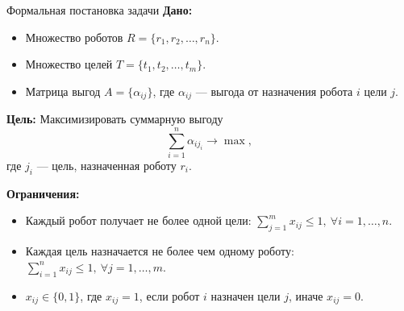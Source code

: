 \documentclass{beamer}
\begin{document}
	\begin{frame}{Формальная постановка задачи}
		\vspace*{-0.2cm}
		\small
		\textbf{Дано:}
		\begin{itemize}
			\item Множество роботов $R = \{r_1, r_2, \ldots, r_n\}$.
			\item Множество целей $T = \{t_1, t_2, \ldots, t_m\}$.
			\item Матрица выгод $A = \{\alpha_{ij}\}$, где $\alpha_{ij}$ --- выгода от назначения робота $i$ цели $j$.
		\end{itemize}
		
		\textbf{Цель:} Максимизировать суммарную выгоду
		\[
		\sum_{i=1}^n \alpha_{i j_i} \rightarrow \max,
		\]
		где $j_i$ --- цель, назначенная роботу $r_i$.
		

		\vspace*{0.1cm}
		\textbf{Ограничения:}
		\begin{itemize}
			\item Каждый робот получает не более одной цели: $\sum_{j=1}^m x_{ij} \leq 1, \ \forall i = 1, \ldots, n$.
			\item Каждая цель назначается не более чем одному роботу: $\sum_{i=1}^n x_{ij} \leq 1, \ \forall j = 1, \ldots, m$.
			\item $x_{ij} \in \{0, 1\}$, где $x_{ij} = 1$, если робот $i$ назначен цели $j$, иначе $x_{ij} = 0$.
		\end{itemize}
	
	\end{frame}

	
\end{document}
